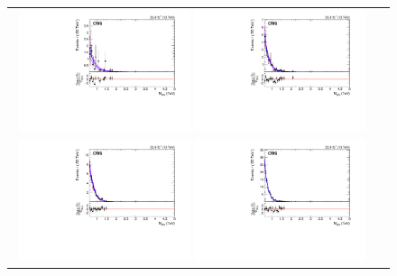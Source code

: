 \begin{figure}[htbp] 
	 \centering 
	 \begin{tabular}{cc}
	 \includegraphics[width=0.48\textwidth]{Plots/BackgroundEstimation/WV/m_lvj_fitting/WWTree_STop_m_lvj_sb_loExpN_with_pull.pdf}
	 \includegraphics[width=0.48\textwidth]{Plots/BackgroundEstimation/WV/m_lvj_fitting/WWTree_STop_m_lvj_signal_regionExpN_with_pull.pdf}\\
	 \includegraphics[width=0.48\textwidth]{Plots/BackgroundEstimation/WV/m_lvj_fitting/WWTree_TTbar_m_lvj_sb_loExpN_with_pull.pdf}
	 \includegraphics[width=0.48\textwidth]{Plots/BackgroundEstimation/WV/m_lvj_fitting/WWTree_TTbar_m_lvj_signal_regionExpN_with_pull.pdf}\\

\end{tabular}
\end{figure}
